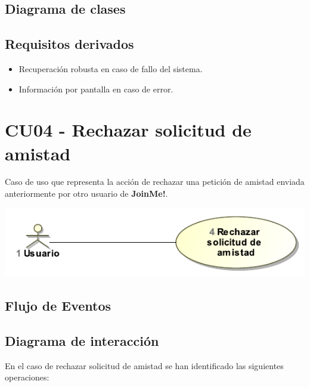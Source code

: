 \documentclass[12pt, a4paper, titlepage]{article}
\begin{document}
\subsection{Diagrama de clases}

\subsection{Requisitos derivados}
\begin{itemize}
	\item Recuperación robusta en caso de fallo del sistema.
	\item Información por pantalla en caso de error.
\end{itemize}

\section{CU04 - Rechazar solicitud de amistad}

Caso de uso que representa la acción de rechazar una petición de amistad enviada anteriormente por otro usuario de \textbf{JoinMe!}.

\begin{center}
	\includegraphics{Imagenes/RechazarSolicitudAmistadCU}
\end{center}
\subsection{Flujo de Eventos}



\subsection{Diagrama de interacción}
En el caso de {\sc rechazar solicitud de amistad } se han identificado las siguientes operaciones:
\end{document}
